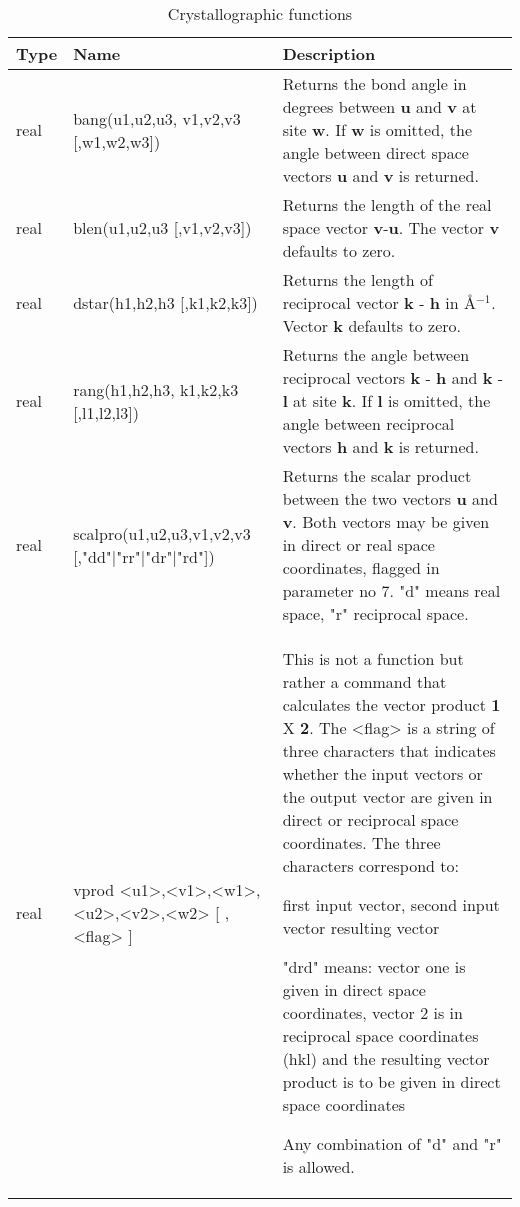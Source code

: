 \begin{table}[!tbh]
\centering
\begin{tabularx}{\textwidth}{|p{10mm}|p{47mm}|X|}
  \hline
  {\bf Type} & {\bf Name} & {\bf Description} \\
  \hline\hline
  real & \raggedright bang(u1,u2,u3, v1,v2,v3 [,w1,w2,w3]) &
       Returns the bond angle in degrees between {\bf u} and {\bf v}
       at site {\bf w}. If {\bf w} is omitted, the angle between
       direct space vectors {\bf u} and {\bf v} is returned. \\
  real & \raggedright blen(u1,u2,u3 [,v1,v2,v3]) &
       Returns the length of the real space vector {\bf v}-{\bf u}.
       The vector {\bf v} defaults to zero. \\
  real & \raggedright dstar(h1,h2,h3 [,k1,k2,k3]) &
       Returns the length of reciprocal vector {\bf k} - {\bf h} in
       \AA$^{-1}$. Vector {\bf k} defaults to zero. \\
  real & \raggedright rang(h1,h2,h3, k1,k2,k3 [,l1,l2,l3]) &
       Returns the angle between reciprocal vectors {\bf k} - {\bf h} and
       {\bf k} - {\bf l} at site {\bf k}.  If {\bf l} is omitted, the angle
       between reciprocal vectors {\bf h} and {\bf k} is returned. \\
  real & \raggedright scalpro(u1,u2,u3,v1,v2,v3 [,{"dd"|"rr"|"dr"|"rd"}]) &
       Returns the scalar product between the two vectors {\bf u} 
       and {\bf v}.  Both vectors may be given in direct
       or real space coordinates, flagged in parameter no 7. "d" 
       means real space, "r" reciprocal space. \\
  real & \raggedright vprod <u1>,<v1>,<w1>, <u2>,<v2>,<w2> [ ,<flag> ] &
       This is not a function but rather a command that calculates the 
       vector product {\bf 1} X {\bf 2}. The <flag> is a string of three
       characters that indicates whether the input vectors or the output
       vector are given in direct or reciprocal space coordinates. The
       three characters correspond to:

       first input vector,
       second input vector
       resulting vector

       "drd" means: vector one is given in direct space coordinates, vector 2
                is in reciprocal space coordinates (hkl) and the
                resulting vector product is to be given in direct space
                coordinates

       Any combination of "d" and "r" is allowed. \\
  \hline
\end{tabularx}
\caption{\label{func-cryst}Crystallographic functions}
\end{table}


